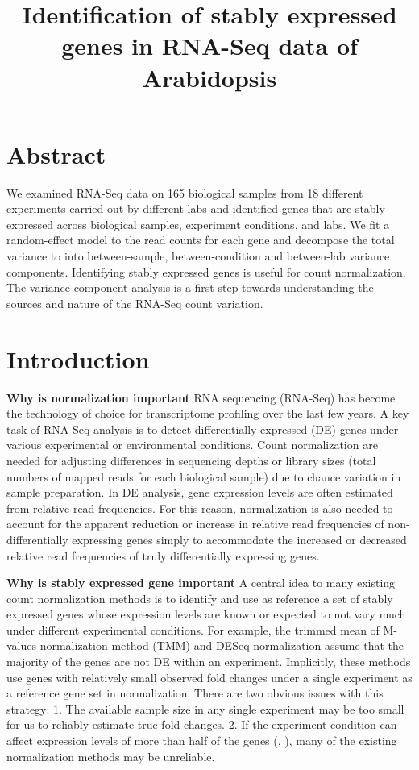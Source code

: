 \documentclass[11pt, a4paper]{article}
\title{Identification of stably expressed genes in RNA-Seq data of  Arabidopsis}
\date{} %
\begin{document}
\maketitle

\section*{Abstract}
We examined RNA-Seq data on 165 biological samples from 18 different
experiments carried out by different labs and identified genes that are stably
expressed across biological samples, experiment conditions, and labs. We fit a
random-effect model to the read counts for each gene and decompose the total
variance to into between-sample, between-condition and between-lab variance
components. Identifying stably expressed genes is useful for count
normalization. The variance component analysis is a first step towards
understanding the sources and nature of the RNA-Seq count variation.


\section{Introduction}

\textbf{Why is normalization important}
RNA sequencing (RNA-Seq) has become the technology of choice for transcriptome
profiling over the last few years. A key task of RNA-Seq analysis is to detect
differentially expressed (DE) genes under various experimental or
environmental conditions. Count normalization are needed for adjusting
differences in sequencing depths or library sizes (total numbers of mapped
reads for each biological sample) due to chance variation in sample
preparation.  In DE analysis, gene expression levels are often estimated from
relative read frequencies. For this reason, normalization is also needed to
account for the apparent reduction or increase in relative read frequencies of
non-differentially expressing genes simply to accommodate the increased or
decreased relative read frequencies of truly differentially expressing genes.

\textbf{Why is stably expressed gene important}
A central idea to many existing count normalization methods is to identify and
use as reference a set of stably expressed genes whose expression levels are
known or expected to not vary much under different experimental conditions.
For example, the trimmed mean of M-values normalization method	(TMM) \citep{robinson2010scaling} and DESeq normalization \citep{anders2010differential}  assume that the majority of
the genes are not DE within an experiment. 
Implicitly, these methods use genes with relatively small observed fold
changes under a single experiment as a reference gene set in normalization.
There are two obvious issues with this strategy: 1. The available sample size
in any single experiment may be too small for us to reliably estimate true
fold changes. 2.  If the experiment condition can affect expression levels of
more than half of the genes (\cite{loven2012revisiting}, \cite{wu2013use}), many of the existing normalization methods may be unreliable. 
\end{document}
